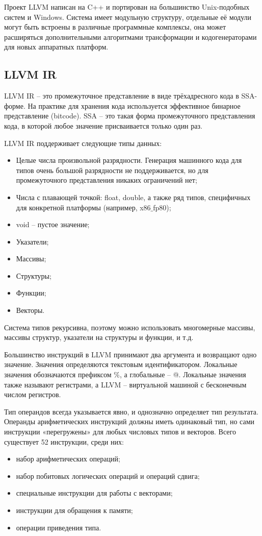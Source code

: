 Проект LLVM написан на C++ и портирован на большинство Unix-подобных систем и Windows. Система имеет модульную структуру, отдельные её модули могут быть встроены в различные программные комплексы, она может расширяться дополнительными алгоритмами трансформации и кодогенераторами для новых аппаратных платформ.

\subsection{LLVM IR}
LLVM IR -- это промежуточное представление в виде трёхадресного кода в SSA-форме. На практике для хранения кода используется эффективное бинарное представление (bitcode). SSA -- это такая форма промежуточного представления кода, в которой любое значение присваивается только один раз.

LLVM IR поддерживает следующие типы данных:
\begin{itemize}
    \item Целые числа произвольной разрядности. Генерация машинного кода для типов очень большой разрядности не поддерживается, но для промежуточного представления никаких ограничений нет;
    \item Числа с плавающей точкой: float, double, а также ряд типов, специфичных для конкретной платформы (например, x86$\_$fp80);
    \item void -- пустое значение;
    \item Указатели;
    \item Массивы;
    \item Структуры;
    \item Функции;
    \item Векторы.
\end{itemize}

Система типов рекурсивна, поэтому можно использовать многомерные массивы, массивы структур, указатели на структуры и функции, и т.д.

Большинство инструкций в LLVM принимают два аргумента и возвращают одно значение. Значения определяются текстовым идентификатором. Локальные значения обозначаются префиксом $\%$, а глобальные -- @. Локальные значения также называют регистрами, а LLVM -- виртуальной машиной с бесконечным числом регистров.

Тип операндов всегда указывается явно, и однозначно определяет тип результата. Операнды арифметических инструкций должны иметь одинаковый тип, но сами инструкции «перегружены» для любых числовых типов и векторов.
Всего существует 52 инструкции, среди них:
\begin{itemize}
    \item набор арифметических операций;
    \item набор побитовых логических операций и операций сдвига;
    \item специальные инструкции для работы с векторами;
    \item инструкции для обращения к памяти;
    \item операции приведения типа.
\end{itemize}

